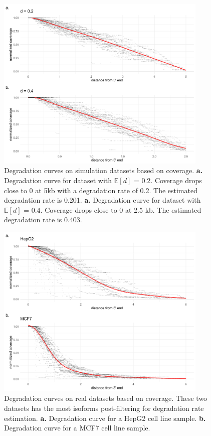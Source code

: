 \begin{figure}[H]
    \centering
    \includegraphics[width=0.9\textwidth]{figures/sec-2-cov-sim.png}
    \caption[Degradation curves on simulation datasets based on coverage]{Degradation curves on simulation datasets based on coverage. \textbf{a.} Degradation curve for dataset with $\mathbb{E}[d]$ = 0.2. Coverage drops close to 0 at 5kb with a degradation rate of 0.2. The estimated degradation rate is 0.201. \textbf{a.} Degradation curve for dataset with $\mathbb{E}[d]$ = 0.4. Coverage drops close to 0 at 2.5 kb. The estimated degradation rate is 0.403.}
    \label{fig:cov-sim}
\end{figure}

\begin{figure}[H]
    \centering
    \includegraphics[width=0.9\textwidth]{figures/sec-2-cov-real.png}
    \caption[Degradation curves on real datasets based on coverage]{Degradation curves on real datasets based on coverage. These two datasets has the most isoforms post-filtering for degradation rate estimation. \textbf{a.} Degradation curve for a HepG2 cell line sample. \textbf{b.} Degradation curve for a MCF7 cell line sample.}
    \label{fig:cov-real}
\end{figure}

